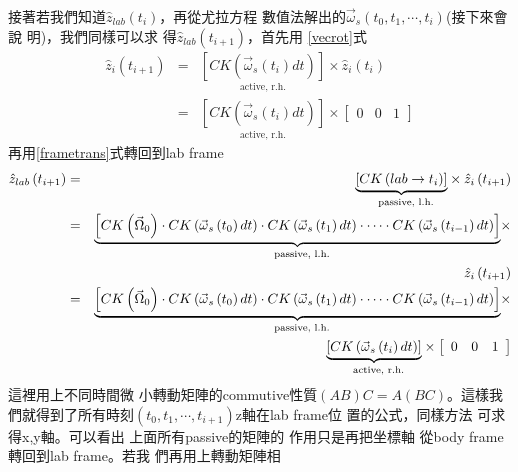 \documentclass[12pt,twoside]{article}
\begin{document}
接著若我們知道$\hat{z}_{lab}\left(
t_{i}\right) $，再從尤拉方程%
數值法解出的$\vec{\omega}_{s}\left(
t_{0},t_{1},\cdots ,t_{i}\right) $(接下來會說%
明)，我們同樣可以求%
得$\hat{z}_{lab}\left( t_{i+1}\right) $，首先用%
\ref{vecrot}式%
\begin{eqnarray*}
\hat{z}_{i}\left( t_{i+1}\right) &=&\underset{\text{active, r.h.}}{\left[
CK\left( \vec{\omega}_{s}\left( t_{i}\right) dt\right) \right] }\times \hat{z%
}_{i}\left( t_{i}\right) \\
&=&\underset{\text{active, r.h.}}{\left[ CK\left( \vec{\omega}_{s}\left(
t_{i}\right) dt\right) \right] }\times \left[ 
\begin{array}{ccc}
0 & 0 & 1%
\end{array}%
\right]
\end{eqnarray*}%
再用\ref{frametrans}式轉回到lab frame%
\begin{eqnarray}
\hat{z}_{lab}\left( t_{i+1}\right) &=&\underset{\text{passive, l.h.}}{%
\underbrace{\left[ CK\left( lab\rightarrow t_{i}\right) \right] }}\times 
\hat{z}_{i}\left( t_{i+1}\right)  \notag \\
&=&\underset{\text{passive, l.h.}}{\underbrace{\left[ CK\left( \vec{\Omega}%
_{0}\right) \cdot CK\left( \vec{\omega}_{s}\left( t_{0}\right) dt\right)
\cdot CK\left( \vec{\omega}_{s}\left( t_{1}\right) dt\right) \cdot \cdots
\cdot CK\left( \vec{\omega}_{s}\left( t_{i-1}\right) dt\right) \right] }}%
\times  \notag \\
&&\hat{z}_{i}\left( t_{i+1}\right)  \notag \\
&=&\underset{\text{passive, l.h.}}{\underbrace{\left[ CK\left( \vec{\Omega}%
_{0}\right) \cdot CK\left( \vec{\omega}_{s}\left( t_{0}\right) dt\right)
\cdot CK\left( \vec{\omega}_{s}\left( t_{1}\right) dt\right) \cdot \cdots
\cdot CK\left( \vec{\omega}_{s}\left( t_{i-1}\right) dt\right) \right] }}%
\times  \notag \\
&&\underset{\text{active, r.h.}}{\underbrace{\left[ CK\left( \vec{\omega}%
_{s}\left( t_{i}\right) dt\right) \right] }}\times \left[ 
\begin{array}{ccc}
0 & 0 & 1%
\end{array}%
\right]  \label{iterateeq0}
\end{eqnarray}%
這裡用上不同時間微%
小轉動矩陣的commutive性質$%
\left( AB\right) C=A\left( BC\right) $。這樣我%
們就得到了所有時刻$%
\left( t_{0},t_{1},\cdots ,t_{i+1}\right) $z軸在lab frame位%
置的公式，同樣方法%
可求得x,y軸。可以看出%
上面所有passive的矩陣的%
作用只是再把坐標軸%
從body frame轉回到lab frame。若我%
們再用上轉動矩陣相%
\end{document}
